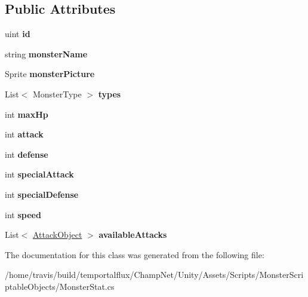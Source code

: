 \subsection*{Public Attributes}
\begin{DoxyCompactItemize}
\item 
\hypertarget{class_monster_stat_a37540f37b42ba6f7e9bfcf2690982e3f}{uint {\bfseries id}}\label{class_monster_stat_a37540f37b42ba6f7e9bfcf2690982e3f}

\item 
\hypertarget{class_monster_stat_ae1f09abad9691a1b0df3b3a3575a64e3}{string {\bfseries monster\-Name}}\label{class_monster_stat_ae1f09abad9691a1b0df3b3a3575a64e3}

\item 
\hypertarget{class_monster_stat_a1699a9350fa5b1b0cece5a0a5fdd112a}{Sprite {\bfseries monster\-Picture}}\label{class_monster_stat_a1699a9350fa5b1b0cece5a0a5fdd112a}

\item 
\hypertarget{class_monster_stat_a01771faf888660584ddf5e134d4da3fb}{List$<$ Monster\-Type $>$ {\bfseries types}}\label{class_monster_stat_a01771faf888660584ddf5e134d4da3fb}

\item 
\hypertarget{class_monster_stat_a3f84d73d947c10926862b904308f01ee}{int {\bfseries max\-Hp}}\label{class_monster_stat_a3f84d73d947c10926862b904308f01ee}

\item 
\hypertarget{class_monster_stat_aa712f00d29d985ecbf192710dd093e42}{int {\bfseries attack}}\label{class_monster_stat_aa712f00d29d985ecbf192710dd093e42}

\item 
\hypertarget{class_monster_stat_adcd2f958be981766592eefec3d7cd7da}{int {\bfseries defense}}\label{class_monster_stat_adcd2f958be981766592eefec3d7cd7da}

\item 
\hypertarget{class_monster_stat_ad1ef4ed9e67df473269df08ba716ce0e}{int {\bfseries special\-Attack}}\label{class_monster_stat_ad1ef4ed9e67df473269df08ba716ce0e}

\item 
\hypertarget{class_monster_stat_a38187f97efd1e52b77340058ecef8198}{int {\bfseries special\-Defense}}\label{class_monster_stat_a38187f97efd1e52b77340058ecef8198}

\item 
\hypertarget{class_monster_stat_a8e1945c1a296695622bada26319ff9e3}{int {\bfseries speed}}\label{class_monster_stat_a8e1945c1a296695622bada26319ff9e3}

\item 
\hypertarget{class_monster_stat_ae5ba7dc95fd5115dfed29cfeaafae51f}{List$<$ \hyperlink{class_attack_object}{Attack\-Object} $>$ {\bfseries available\-Attacks}}\label{class_monster_stat_ae5ba7dc95fd5115dfed29cfeaafae51f}

\end{DoxyCompactItemize}


The documentation for this class was generated from the following file\-:\begin{DoxyCompactItemize}
\item 
/home/travis/build/temportalflux/\-Champ\-Net/\-Unity/\-Assets/\-Scripts/\-Monster\-Scriptable\-Objects/Monster\-Stat.\-cs\end{DoxyCompactItemize}
